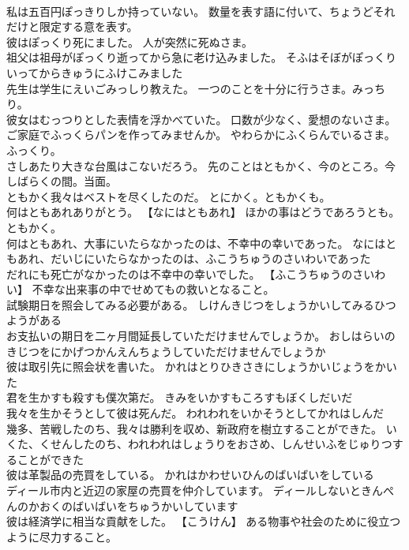 \documentclass[8pt]{extreport}
\begin{document}
\begin{CJK}{UTF8}{min}
\\	私は五百円ぽっきりしか持っていない。	数量を表す語に付いて、ちょうどそれだけと限定する意を表す。
\\	彼はぽっくり死にました。	人が突然に死ぬさま。
\\	祖父は祖母がぽっくり逝ってから急に老け込みました。	そふはそぼがぽっくりいってからきゅうにふけこみました 
\\	先生は学生にえいごみっしり教えた。	一つのことを十分に行うさま。みっちり。
\\	彼女はむっつりとした表情を浮かべていた。	口数が少なく、愛想のないさま。
\\	ご家庭でふっくらパンを作ってみませんか。	やわらかにふくらんでいるさま。ふっくり。
\\	さしあたり大きな台風はこないだろう。	先のことはともかく、今のところ。今しばらくの間。当面。
\\	ともかく我々はベストを尽くしたのだ。	とにかく。ともかくも。
\\	何はともあれありがとう。	【なにはともあれ】 ほかの事はどうであろうとも。ともかく。
\\	何はともあれ、大事にいたらなかったのは、不幸中の幸いであった。	なにはともあれ、だいじにいたらなかったのは、ふこうちゅうのさいわいであった 
\\	だれにも死亡がなかったのは不幸中の幸いでした。	【ふこうちゅうのさいわい】 不幸な出来事の中でせめてもの救いとなること。
\\	試験期日を照会してみる必要がある。	しけんきじつをしょうかいしてみるひつようがある 
\\	お支払いの期日を二ヶ月間延長していただけませんでしょうか。	おしはらいのきじつをにかげつかんえんちょうしていただけませんでしょうか 
\\	彼は取引先に照会状を書いた。	かれはとりひきさきにしょうかいじょうをかいた 
\\	君を生かすも殺すも僕次第だ。	きみをいかすもころすもぼくしだいだ 
\\	我々を生かそうとして彼は死んだ。	われわれをいかそうとしてかれはしんだ 
\\	幾多、苦戦したのち、我々は勝利を収め、新政府を樹立することができた。	いくた、くせんしたのち、われわれはしょうりをおさめ、しんせいふをじゅりつすることができた 
\\	彼は革製品の売買をしている。	かれはかわせいひんのばいばいをしている 
\\	ディール市内と近辺の家屋の売買を仲介しています。	ディールしないときんぺんのかおくのばいばいをちゅうかいしています 
\\	彼は経済学に相当な貢献をした。	【こうけん】 ある物事や社会のために役立つように尽力すること。

\end{CJK}
\end{document}
